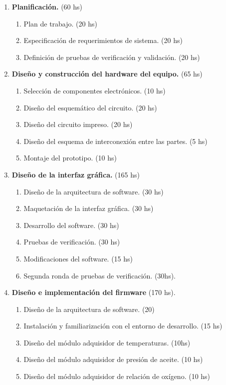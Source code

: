 \documentclass[11pt]{charter}
\begin{document}
\begin{enumerate}
\item \textbf{Planificación.} (60 hs)
	\begin{enumerate}
	\item Plan de trabajo. (20 hs)
	\item Especificación de requerimientos de sistema. (20 hs)
	\item Definición de pruebas de verificación y validación. (20 hs)
	\end{enumerate}
\item \textbf{Diseño y construcción del hardware del equipo.} (65 hs)
	\begin{enumerate}
	\item Selección de componentes electrónicos. (10 hs)
	\item Diseño del esquemático del circuito. (20 hs)
	\item Diseño del circuito impreso. (20 hs)
	\item Diseño del esquema de interconexión entre las partes. (5 hs)
	\item Montaje del prototipo. (10 hs)
	\end{enumerate}
\item \textbf{Diseño de la interfaz gráfica.} (165 hs)
	\begin{enumerate}
	\item Diseño de la arquitectura de software. (30 hs)
	\item Maquetación de la interfaz gráfica. (30 hs)
	\item Desarrollo del software. (30 hs)
	\item Pruebas de verificación. (30 hs)
	\item Modificaciones del software. (15 hs)
	\item Segunda ronda de pruebas de verificación. (30hs).
	\end{enumerate}
\item \textbf{Diseño e implementación del firmware} (170 hs).
	\begin{enumerate}
	\item Diseño de la arquitectura de software. (20)
	\item Instalación y familiarización con el entorno de desarrollo. (15 hs)
	\item Diseño del módulo adquisidor de temperaturas. (10hs)
	\item Diseño del módulo adquisidor de presión de aceite. (10 hs)
	\item Diseño del módulo adquisidor de relación de oxígeno. (10 hs)

\end{enumerate}
\end{enumerate}
\end{document}
